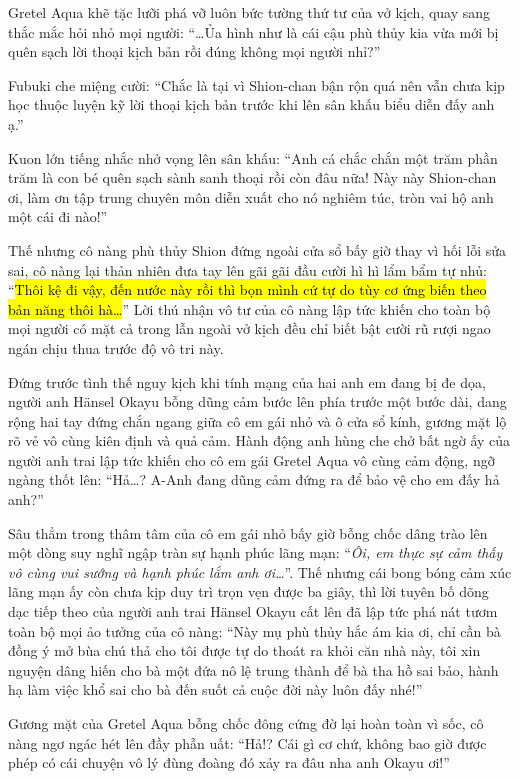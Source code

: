 \documentclass[../main.tex]{subfiles}
\begin{document}
Gretel Aqua khẽ tặc lưỡi phá vỡ luôn bức tường thứ tư của vở kịch, quay sang thắc mắc hỏi nhỏ mọi người: ``\dots Ủa hình như là cái cậu phù thủy kia vừa mới bị quên sạch lời thoại kịch bản rồi đúng không mọi người nhỉ?''

\il

Fubuki che miệng cười: ``Chắc là tại vì Shion-chan bận rộn quá nên vẫn chưa kịp học thuộc luyện kỹ lời thoại kịch bản trước khi lên sân khấu biểu diễn đấy anh ạ.''

Kuon lớn tiếng nhắc nhở vọng lên sân khấu: ``Anh cá chắc chắn một trăm phần trăm là con bé quên sạch sành sanh thoại rồi còn đâu nữa! Này này Shion-chan ơi, làm ơn tập trung chuyên môn diễn xuất cho nó nghiêm túc, tròn vai hộ anh một cái đi nào!''

\il

Thế nhưng cô nàng phù thủy Shion đứng ngoài cửa sổ bấy giờ thay vì hối lỗi sửa sai, cô nàng lại thản nhiên đưa tay lên gãi gãi đầu cười hì hì lẩm bẩm tự nhủ: ``\hl{Thôi kệ đi vậy, đến nước này rồi thì bọn mình cứ tự do tùy cơ ứng biến theo bản năng thôi hà\dots}'' Lời thú nhận vô tư của cô nàng lập tức khiến cho toàn bộ mọi người có mặt cả trong lẫn ngoài vở kịch đều chỉ biết bật cười rũ rượi ngao ngán chịu thua trước độ vô tri này.

Đứng trước tình thế nguy kịch khi tính mạng của hai anh em đang bị đe dọa, người anh Hänsel Okayu bỗng dũng cảm bước lên phía trước một bước dài, dang rộng hai tay đứng chắn ngang giữa cô em gái nhỏ và ô cửa sổ kính, gương mặt lộ rõ vẻ vô cùng kiên định và quả cảm. Hành động anh hùng che chở bất ngờ ấy của người anh trai lập tức khiến cho cô em gái Gretel Aqua vô cùng cảm động, ngỡ ngàng thốt lên: ``Hả\dots? A-Anh đang dũng cảm đứng ra để bảo vệ cho em đấy hả anh?''

Sâu thẳm trong thâm tâm của cô em gái nhỏ bấy giờ bỗng chốc dâng trào lên một dòng suy nghĩ ngập tràn sự hạnh phúc lãng mạn: ``\textit{Ôi, em thực sự cảm thấy vô cùng vui sướng và hạnh phúc lắm anh ơi\dots}''. Thế nhưng cái bong bóng cảm xúc lãng mạn ấy còn chưa kịp duy trì trọn vẹn được ba giây, thì lời tuyên bố dõng dạc tiếp theo của người anh trai Hänsel Okayu cất lên đã lập tức phá nát tươm toàn bộ mọi ảo tưởng của cô nàng: ``Này mụ phù thủy hắc ám kia ơi, chỉ cần bà đồng ý mở bùa chú thả cho tôi được tự do thoát ra khỏi căn nhà này, tôi xin nguyện dâng hiến cho bà một đứa nô lệ trung thành để bà tha hồ sai bảo, hành hạ làm việc khổ sai cho bà đến suốt cả cuộc đời này luôn đấy nhé!''

Gương mặt của Gretel Aqua bỗng chốc đông cứng đờ lại hoàn toàn vì sốc, cô nàng ngơ ngác hét lên đầy phẫn uất: ``Hả!? Cái gì cơ chứ, không bao giờ được phép có cái chuyện vô lý đùng đoàng đó xảy ra đâu nha anh Okayu ơi!''
\end{document}
